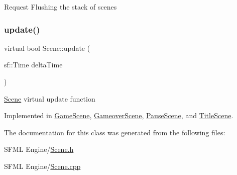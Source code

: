 Request Flushing the stack of scenes \mbox{\label{class_scene_a72683c984a1da2ce4f757705e93730f2}} 
\subsubsection{\texorpdfstring{update()}{update()}}
{\footnotesize\ttfamily virtual bool Scene\+::update (\begin{DoxyParamCaption}\item[{sf\+::\+Time}]{delta\+Time }\end{DoxyParamCaption})\hspace{0.3cm}{\ttfamily [pure virtual]}}

\hyperlink{class_scene}{Scene} virtual update function 

Implemented in \hyperlink{class_game_scene_ae54628d2f041bcad66242584b2db10d6}{Game\+Scene}, \hyperlink{class_gameover_scene_a6b7f650af840f54c78b4fb1cdf2010df}{Gameover\+Scene}, \hyperlink{class_pause_scene_a8504260009b4dfb2380785e938e60b4b}{Pause\+Scene}, and \hyperlink{class_title_scene_a17ce1b5b9f6f8ca44a6ed3326e9e5d0a}{Title\+Scene}.



The documentation for this class was generated from the following files\+:\begin{DoxyCompactItemize}
\item 
S\+F\+M\+L Engine/\hyperlink{_scene_8h}{Scene.\+h}\item 
S\+F\+M\+L Engine/\hyperlink{_scene_8cpp}{Scene.\+cpp}\end{DoxyCompactItemize}
